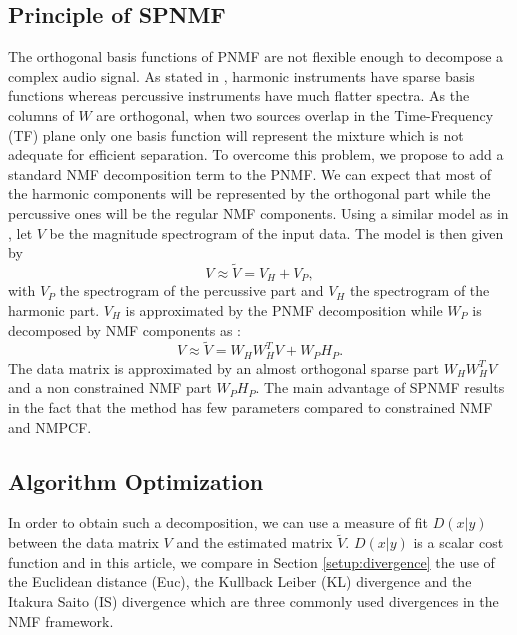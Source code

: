 \documentclass[journal]{IEEEtran}
\begin{document}
\subsection{Principle of SPNMF}

The orthogonal basis functions of PNMF are not flexible enough to decompose a complex audio signal. As stated in \cite{canadas2014percussive}, harmonic instruments have sparse basis functions whereas percussive instruments have much flatter spectra. As the columns of $W$ are orthogonal, when two sources overlap in the Time-Frequency (TF) plane only one basis function will represent the mixture which is not adequate for efficient separation. To overcome this problem, we propose to add a standard NMF decomposition term to the PNMF. We can expect that most of the harmonic components will be represented by the orthogonal part while the percussive ones will be the regular NMF components. Using a similar model as in \cite{laroche2015structured}, let $V$ be the magnitude spectrogram of the input data. The model is then given by
\begin{equation} \label{Cfunction}
V \approx \tilde{V}= V_H + V_{P},
\end{equation}
with $V_P$ the spectrogram of the percussive part and $V_H$ the spectrogram of the harmonic part. $V_H$ is approximated by the PNMF decomposition while $W_P$ is decomposed by NMF components as :
\begin{equation}
V \approx \tilde{V}= W_{H}W_{H}^{T}V + W_{P} H_{P}.
\end{equation}
The data matrix is approximated by an almost orthogonal sparse part $W_HW_H^T V$ and a non constrained NMF part $W_PH_P$. The main advantage of SPNMF results in the fact that the method has few parameters compared to constrained NMF and NMPCF.

\subsection{Algorithm Optimization}

In order to obtain such a decomposition, we can use a measure of fit $D(x|y)$ between the data matrix $V$ and the estimated matrix $\tilde{V}$. $D(x|y)$ is a scalar cost function and in this article, we compare in Section \ref{setup:divergence} the use of the Euclidean distance (Euc), the Kullback Leiber (KL) divergence and the Itakura Saito (IS) divergence which are three commonly used divergences in the NMF framework.
\end{document}
